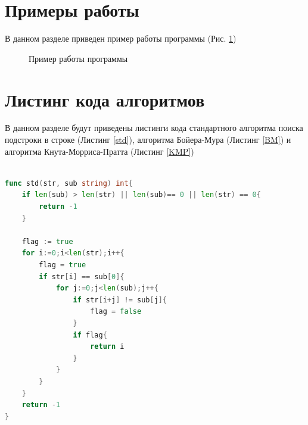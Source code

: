\documentclass[12pt]{report}
\begin{document}
\section{Примеры работы}
В данном разделе приведен пример работы программы (Рис. \ref{ris:example})
\begin{figure}[h]
	\caption{Пример работы программы}
	\label{ris:example}
\end{figure}
\section{Листинг кода алгоритмов}
В данном разделе будут приведены листинги кода стандартного алгоритма поиска подстроки в строке (Листинг \ref{std}), алгоритма Бойера-Мура (Листинг \ref{BM}) и алгоритма Кнута-Морриса-Пратта (Листинг \ref{KMP})
\begin{lstlisting}[label=std,caption = Стандартный алгоритм поиска подстроки в строке, language = go]

func std(str, sub string) int{
	if len(sub) > len(str) || len(sub)== 0 || len(str) == 0{
		return -1
	}
	
	flag := true
	for i:=0;i<len(str);i++{
		flag = true
		if str[i] == sub[0]{
			for j:=0;j<len(sub);j++{
				if str[i+j] != sub[j]{
					flag = false
				}
				if flag{
					return i
				}
			}
		}
	}
	return -1
}
\end{lstlisting}
\end{document}
